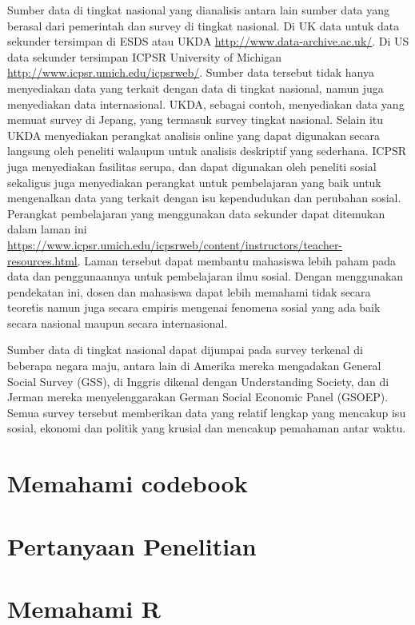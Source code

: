 \documentclass[
]{book}
\begin{document}
Sumber data di tingkat nasional yang dianalisis antara lain sumber data yang berasal dari pemerintah dan survey di tingkat nasional. Di UK data untuk data sekunder tersimpan di ESDS atau UKDA \url{http://www.data-archive.ac.uk/}. Di US data sekunder tersimpan ICPSR University of Michigan \url{http://www.icpsr.umich.edu/icpsrweb/}. Sumber data tersebut tidak hanya menyediakan data yang terkait dengan data di tingkat nasional, namun juga menyediakan data internasional. UKDA, sebagai contoh, menyediakan data yang memuat survey di Jepang, yang termasuk survey tingkat nasional. Selain itu UKDA menyediakan perangkat analisis online yang dapat digunakan secara langsung oleh peneliti walaupun untuk analisis deskriptif yang sederhana. ICPSR juga menyediakan fasilitas serupa, dan dapat digunakan oleh peneliti sosial sekaligus juga menyediakan perangkat untuk pembelajaran yang baik untuk mengenalkan data yang terkait dengan isu kependudukan dan perubahan sosial. Perangkat pembelajaran yang menggunakan data sekunder dapat ditemukan dalam laman ini \url{https://www.icpsr.umich.edu/icpsrweb/content/instructors/teacher-resources.html}. Laman tersebut dapat membantu mahasiswa lebih paham pada data dan penggunaannya untuk pembelajaran ilmu sosial. Dengan menggunakan pendekatan ini, dosen dan mahasiswa dapat lebih memahami tidak secara teoretis namun juga secara empiris mengenai fenomena sosial yang ada baik secara nasional maupun secara internasional.

Sumber data di tingkat nasional dapat dijumpai pada survey terkenal di beberapa negara maju, antara lain di Amerika mereka mengadakan General Social Survey (GSS), di Inggris dikenal dengan Understanding Society, dan di Jerman mereka menyelenggarakan German Social Economic Panel (GSOEP). Semua survey tersebut memberikan data yang relatif lengkap yang mencakup isu sosial, ekonomi dan politik yang krusial dan mencakup pemahaman antar waktu.

\hypertarget{memahami-codebook}{%
\chapter{Memahami codebook}\label{memahami-codebook}}

\hypertarget{pertanyaan-penelitian}{%
\chapter{Pertanyaan Penelitian}\label{pertanyaan-penelitian}}

\hypertarget{memahami-r}{%
\chapter{Memahami R}\label{memahami-r}}
\end{document}
